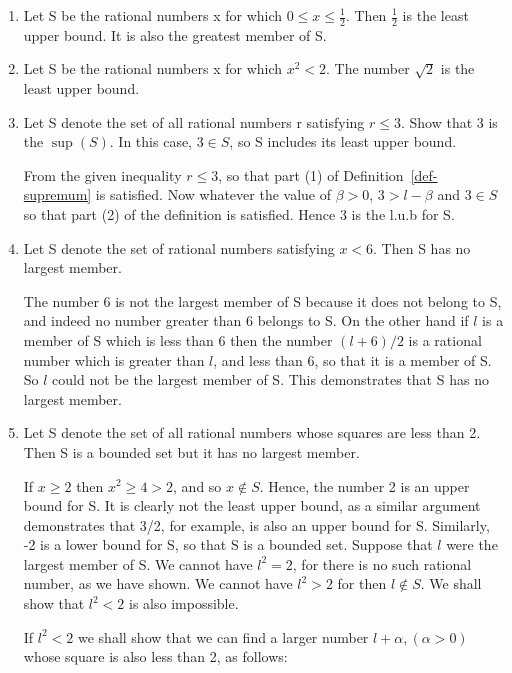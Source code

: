 \documentclass[12pt]{scrbook}
\begin{document}
\begin{enumerate}
	\item Let S be the rational numbers x for which $0 \leq x \leq \frac{1}{2}$. Then $\frac{1}{2}$ is the least upper bound.  It is also the greatest member of S.
	
	\item Let S be the rational numbers x for which $x^2 < 2$.  The number $\sqrt{2}$ is the least upper bound.
	
	\item Let S denote the set of all rational numbers r satisfying $r \leq 3$.  Show that 3 is the $\sup(S)$.  In this case, $3 \in S$, so S includes its least upper bound. 
	
	From the given inequality $r \leq 3$, so that part (1) of Definition~\ref{def-supremum} is satisfied.  Now whatever the value of $\beta >0$, $3 > l - \beta$ and $3 \in S$ so that part (2) of the definition is satisfied.  Hence 3 is the l.u.b for S.
	
	\item Let S denote the set of rational numbers satisfying $x < 6$.  Then S has no largest member.
	
	The number 6 is not the largest member of S because it does not belong to S, and indeed no number greater than 6 belongs to S. On the other hand if $l$ is a member of S which is less than 6 then the number $(l + 6)/2$ is a rational number which is greater than $l$, and less than 6, so that it is a member of S.  So $l$ could not be the largest member of S. This demonstrates that S has no largest member.
	
	\item Let S denote the set of all rational numbers whose squares are less than 2.  Then S is a bounded set but it has no largest member.
	
	If $x \ge 2$ then $x^2 \ge 4 > 2$, and so $x \notin S$.  Hence, the number 2 is an upper bound for S.  It is clearly not the least upper bound, as a similar argument demonstrates that 3/2, for example, is also an upper bound for S.  Similarly, -2 is a lower bound for S, so that S is a bounded set.  Suppose that $l$ were the largest member of S.  We cannot have $l^2 = 2$, for there is no such rational number, as we have shown.  We cannot have $l^2 > 2$ for then $l \notin S$.  We shall show that $l^2 < 2$ is also impossible.
	
	If $l^2 < 2$ we shall show that we can find a larger number $l + \alpha, (\alpha > 0)$ whose square is also less than 2, as follows:
	

\end{enumerate}
\end{document}
